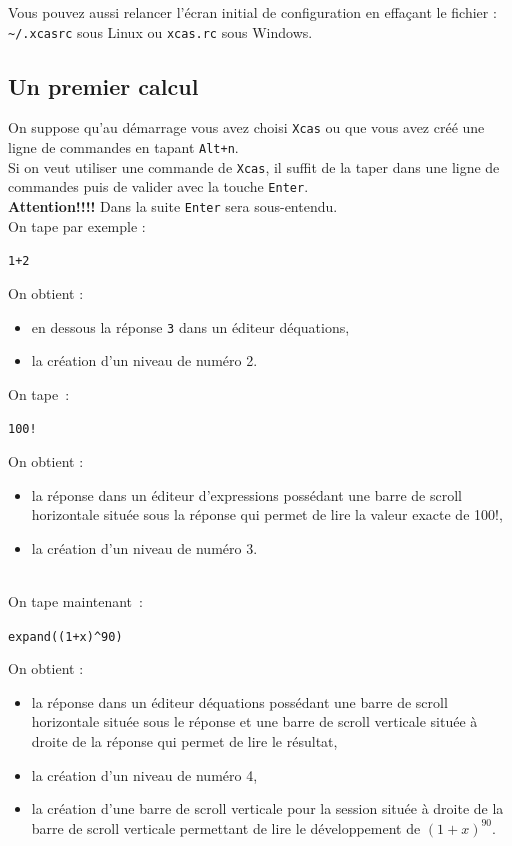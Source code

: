 \documentclass[a4paper,11pt]{article}
\begin{document}
Vous pouvez aussi relancer l'\'ecran initial de configuration 
en effa\c{c}ant le fichier :
\verb|~/.xcasrc| sous Linux ou {\tt xcas.rc} sous Windows.

\subsection{Un premier calcul}\label{sec:calc}
On suppose qu'au d\'emarrage vous avez choisi {\tt Xcas} ou que vous avez 
cr\'e\'e une ligne de commandes en tapant {\tt Alt+n}.\\
Si on veut  utiliser une commande de {\tt Xcas}, il suffit de la taper
dans une ligne de commandes puis de valider avec la touche {\tt Enter}.\\
{\bf Attention!!!!} Dans la suite {\tt Enter} sera sous-entendu.\\
On tape par exemple :
\begin{center}
{\tt 1+2}
\end{center}
On obtient :
\begin{itemize}
\item en dessous la r\'eponse {\tt 3} dans un \'editeur d\'equations,
\item la cr\'eation d'un niveau de num\'ero 2. 
\end{itemize}
\noindent On tape~:
\begin{center}
{\tt 100!}
\end{center}
On obtient :
\begin{itemize}
\item la r\'eponse dans un \'editeur d'expressions poss\'edant une  barre de 
scroll horizontale  situ\'ee  sous la r\'eponse qui permet de lire la valeur 
exacte de 100!,
\item la cr\'eation d'un niveau de num\'ero 3. 
\end{itemize}
\ \\
\noindent On tape maintenant~:
\begin{center}
{\tt expand((1+x)\verb|^|90)}
\end{center}
On obtient :
\begin{itemize}
\item la r\'eponse dans un \'editeur d\'equations poss\'edant une  barre de 
scroll horizontale situ\'ee  sous le r\'eponse et une  barre de scroll 
verticale situ\'ee \`a droite de la r\'eponse qui permet de lire le 
r\'esultat,
\item la cr\'eation d'un niveau de num\'ero 4, 
\item la cr\'eation d'une barre de scroll verticale pour la session situ\'ee 
\`a droite de la barre de scroll verticale permettant de lire le 
d\'eveloppement de $(1+x)^{90}$.
\end{itemize}
\end{document}
